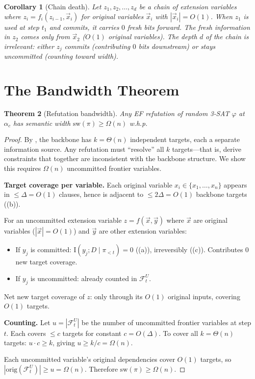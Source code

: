 \documentclass[11pt]{article}
\newtheorem{theorem}{Theorem}[section]
\newtheorem{corollary}[theorem]{Corollary}
\theoremstyle{definition}
\newcommand{\MI}{\mathrm{I}}
\newcommand{\frontier}{\mathcal{F}}
\begin{document}
\begin{corollary}[Chain death]\label{cor:chain-death}
Let $z_1, z_2, \ldots, z_d$ be a chain of extension variables where
$z_i = f_i(z_{i-1}, \vec{x}_i)$ for original variables $\vec{x}_i$
with $|\vec{x}_i| = O(1)$.  When $z_1$ is used at step $t_1$ and
commits, it carries $0$ fresh bits forward.  The fresh information in
$z_2$ comes only from $\vec{x}_2$ ($O(1)$ original variables).
The depth $d$ of the chain is irrelevant: either $z_j$ commits
(contributing $0$ bits downstream) or stays uncommitted (counting toward
width).
\end{corollary}

\section{The Bandwidth Theorem}\label{sec:bandwidth}

\begin{theorem}[Refutation bandwidth]\label{thm:bandwidth}
Any EF refutation of random 3-SAT $\varphi$ at $\alpha_c$ has semantic
width $\mathrm{sw}(\pi) \geq \Omega(n)$ w.h.p.
\end{theorem}

\begin{proof}
By , the backbone has $k = \Theta(n)$ independent
targets, each a separate information source.  Any refutation must
``resolve'' all $k$ targets---that is, derive constraints that together
are inconsistent with the backbone structure.  We show this requires
$\Omega(n)$ uncommitted frontier variables.

\textbf{Target coverage per variable.}  Each original variable
$x_i \in \{x_1, \ldots, x_n\}$ appears in $\leq \Delta = O(1)$
clauses, hence is adjacent to $\leq 2\Delta = O(1)$ backbone targets
((b)).

For an uncommitted extension variable $z = f(\vec{x}, \vec{y})$ where
$\vec{x}$ are original variables ($|\vec{x}| = O(1)$) and $\vec{y}$
are other extension variables:
\begin{itemize}
\item If $y_j$ is committed: $\MI(y_j; D \mid \pi_{<t}) = 0$
((a)), irreversibly ((c)).
Contributes $0$ new target coverage.
\item If $y_j$ is uncommitted: already counted in $\frontier_t^U$.
\end{itemize}
Net new target coverage of $z$: only through its $O(1)$ original
inputs, covering $O(1)$ targets.

\textbf{Counting.}  Let $u = |\frontier_t^U|$ be the number of
uncommitted frontier variables at step $t$.  Each covers $\leq c$
targets for constant $c = O(\Delta)$.  To cover all $k = \Theta(n)$
targets: $u \cdot c \geq k$, giving $u \geq k/c = \Omega(n)$.

Each uncommitted variable's original dependencies cover $O(1)$ targets,
so $|\mathrm{orig}(\frontier_t^U)| \geq u = \Omega(n)$.  Therefore
$\mathrm{sw}(\pi) \geq \Omega(n)$.
\end{proof}
\end{document}
